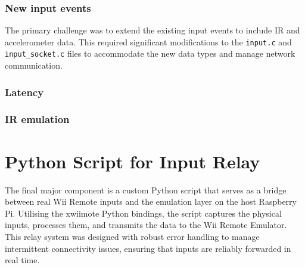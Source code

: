 \subsubsection{New input events}
The primary challenge was to extend the existing input events to include IR and accelerometer data. This required significant modifications to the \texttt{input.c} and \texttt{input\_socket.c} files to accommodate the new data types and manage network communication.

\subsubsection{Latency}

\subsubsection{IR emulation}









\section{Python Script for Input Relay}
The final major component is a custom Python script that serves as a bridge between real Wii Remote inputs and the emulation layer on the host Raspberry Pi. Utilising the xwiimote Python bindings, the script captures the physical inputs, processes them, and transmits the data to the Wii Remote Emulator. This relay system was designed with robust error handling to manage intermittent connectivity issues, ensuring that inputs are reliably forwarded in real time.


